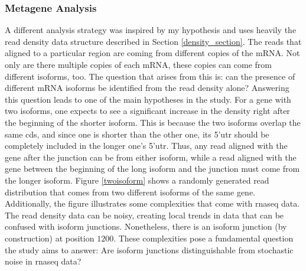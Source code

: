 \documentclass[12pt]{article}
\begin{document}
\subsubsection{Metagene Analysis}\label{metagene_sect}
A different analysis strategy was inspired by my hypothesis and uses heavily the read density data structure described in Section \ref{density_section}. The reads that aligned to a particular region are coming from different copies of the mRNA. Not only are there multiple copies of each mRNA, these copies can come from different isoforms, too. The question that arises from this is: can the presence of different mRNA isoforms be identified from the read density alone? Answering this question leads to one of the main hypotheses in the study. For a gene with two isoforms, one expects to see a significant increase in the density right after the beginning of the shorter isoform. This is because the two isoforms overlap the same \acrshort{cds}, and since one is shorter than the other one, its 5'\acrshort{utr} should be completely included in the longer one's 5'\acrshort{utr}. Thus, any read aligned with the gene after the junction can be from either isoform, while a read aligned with the gene between the beginning of the long isoform and the junction must come from the longer isoform. Figure \ref{twoisoform} shows a randomly generated read distribution that comes from two different isoforms of the same gene. Additionally, the figure illustrates some complexities that come with \acrshort{rnaseq} data. The read density data can be noisy, creating local trends in data that can be confused with isoform junctions. Nonetheless, there is an isoform junction (by construction) at position $1200$. These complexities pose a fundamental question the study aims to answer: Are isoform junctions distinguishable from stochastic noise in \acrshort{rnaseq} data?


\end{document}
